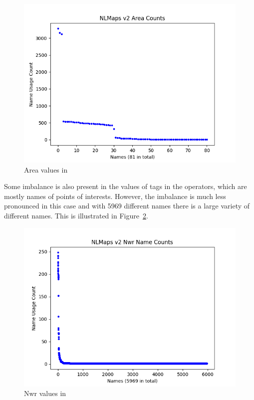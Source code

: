 \begin{figure}[h]
  \centering
  \includegraphics[width=\textwidth]{fig/nlmaps_v2_area_counts.png}
  \caption{Area values in \nlmapstwo{}}
  \label{fig:nlmaps-v2-areas}
\end{figure}

Some imbalance is also present in the values of  tags in the
 operators, which are mostly names of points of interests. However, the
imbalance is much less pronounced in this case and with \num{5969} different
names there is a large variety of different names. This is illustrated in
Figure~\ref{fig:nlmaps-v2-nwrs}.

\begin{figure}[h]
  \centering
  \includegraphics[width=\textwidth]{fig/nlmaps_v2_nwr_name_counts.png}
  \caption{Nwr values in \nlmapstwo{}}
  \label{fig:nlmaps-v2-nwrs}
\end{figure}

